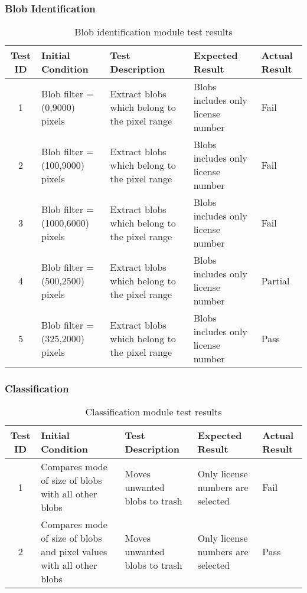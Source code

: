 \documentclass[a4paper,10pt]{iesreport}
\begin{document}
\subsubsection*{Blob Identification}
\begin{table}
\caption{Blob identification module test results}
\begin{tabular}{c|p{3cm}|p{3.5cm}|p{3.2cm}|p{2.5cm}}
\hline
\textbf{Test ID} & \textbf{Initial Condition} & \textbf{Test Description} & \textbf{Expected Result}  & \textbf{Actual Result}\\ [0.3ex]
\hline
1 & Blob filter = (0,9000) pixels & Extract blobs which belong to the pixel range & Blobs includes only license number & Fail\\
\hline
2 & Blob filter = (100,9000) pixels & Extract blobs which belong to the pixel range & Blobs includes only license number & Fail \\
\hline
3 & Blob filter = (1000,6000) pixels & Extract blobs which belong to the pixel range & Blobs includes only license number  & Fail\\
\hline
4 & Blob filter = (500,2500) pixels & Extract blobs which belong to the pixel range & Blobs includes only license number  & Partial\\
\hline
5 & Blob filter = (325,2000) pixels & Extract blobs which belong to the pixel range & Blobs includes only license number & Pass\\%
\hline
\end{tabular}
\label{table:nonlin}
\end{table}
\newpage
\subsubsection*{Classification}
\begin{table}
\caption{Classification module test results}
\begin{tabular}{c|p{3cm}|p{3.5cm}|p{3.2cm}|p{2.5cm}}
\hline
\textbf{Test ID} & \textbf{Initial Condition} & \textbf{Test Description} & \textbf{Expected Result}  & \textbf{Actual Result}\\ [0.3ex]
\hline
1 & Compares mode of size of blobs with all other blobs & Moves unwanted blobs to trash &  Only license numbers are selected & Fail
\\ \hline
2 & Compares mode of size of blobs and pixel values with all other blobs & Moves unwanted blobs to trash &  Only license numbers are selected  & Pass\\
\hline
\end{tabular}
\label{table:nonlin}
\end{table}
\end{document}
